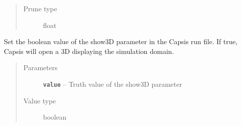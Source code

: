 \documentclass[letterpaper,10pt,english]{sphinxmanual}
\begin{document}
\begin{fulllineitems}
\begin{fulllineitems}
\begin{quote}
\begin{description}
\item[{Prune type}] \leavevmode
float

\end{description}\end{quote}

\end{fulllineitems}


\begin{fulllineitems}
\label{capsis_RunConfig:capsis.RunConfig.set_show3D}
Set the boolean value of the show3D parameter in the Capsis run file. If
true, Capsis will open a 3D displaying the simulation domain.
\begin{quote}\begin{description}
\item[{Parameters}] \leavevmode
\textbf{\texttt{value}} -- Truth value of the show3D parameter

\item[{Value type}] \leavevmode
boolean

\end{description}\end{quote}

\end{fulllineitems}


\begin{fulllineitems}
\label{capsis_RunConfig:capsis.RunConfig.set_srf_cbh}
\end{fulllineitems}


\begin{fulllineitems}
\label{capsis_RunConfig:capsis.RunConfig.set_srf_cover}
\end{fulllineitems}


\begin{fulllineitems}
\label{capsis_RunConfig:capsis.RunConfig.set_srf_dead_load}
\end{fulllineitems}


\end{fulllineitems}
\end{document}
